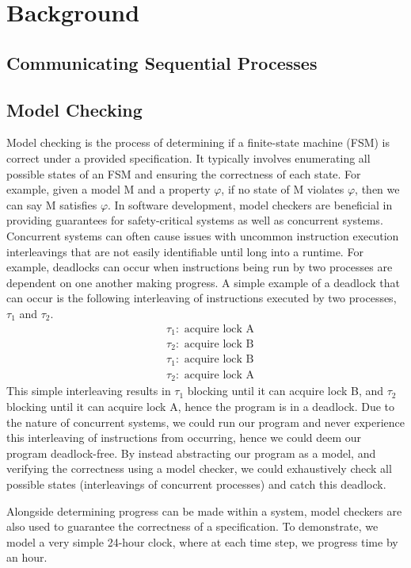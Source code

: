 \chapter{Background}
\section[]{Communicating Sequential Processes}
\section[]{Model Checking}
Model checking is the process of determining if a finite-state machine (FSM) is correct under a provided specification. It typically involves enumerating all possible states of an FSM and ensuring the correctness of each state. For example, given a model M and a property $\varphi$, if no state of M violates $\varphi$, then we can say M satisfies $\varphi$. In software development, model checkers are beneficial in providing guarantees for safety-critical systems as well as concurrent systems. Concurrent systems can often cause issues with uncommon instruction execution interleavings that are not easily identifiable until long into a runtime. For example, deadlocks can occur when instructions being run by two processes are dependent on one another making progress. A simple example of a deadlock that can occur is the following interleaving of instructions executed by two processes, $\tau_1$ and $\tau_2$. 
\[
\begin{aligned}
& \tau_1: \text{ acquire lock A} \\
& \tau_2: \text{ acquire lock B} \\
& \tau_1: \text{ acquire lock B} \\
& \tau_2: \text{ acquire lock A}
\end{aligned}
\]
This simple interleaving results in $\tau_1$ blocking until it can acquire lock B, and $\tau_2$ blocking until it can acquire lock A, hence the program is in a deadlock. Due to the nature of concurrent systems, we could run our program and never experience this interleaving of instructions from occurring, hence we could deem our program deadlock-free. By instead abstracting our program as a model, and verifying the correctness using a model checker, we could exhaustively check all possible states (interleavings of concurrent processes) and catch this deadlock. 
\par
Alongside determining progress can be made within a system, model checkers are also used to guarantee the correctness of a specification. To demonstrate, we model a very simple 24-hour clock, where at each time step, we progress time by an hour.
